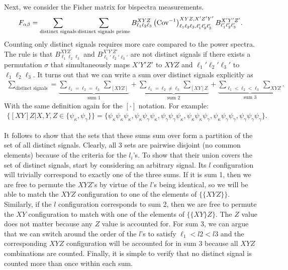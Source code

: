 \documentclass[11pt]{article} %
\DeclareRobustCommand{\Cov}{\ifmmode\text{Cov}\else d\fi}
\newcommand{\br}[1]{\ensuremath{\left( #1 \right)}}
\begin{document}
Next, we consider the Fisher matrix for bispectra measurements.
\begin{equation*}
    F_{\alpha\beta} = \sum_{\text{distinct signals}}\sum_{\text{distinct signals prime}} B^{XYZ}_{\ell_1\ell_2\ell_3}\br{\Cov^{-1}}^{XYZ,X'Z'Y'}_{\ell_1\ell_2\ell_3,\ell_1'\ell_2'\ell_3'}B^{X'Y'Z'}_{\ell_1'\ell_2'\ell_3'}.
\end{equation*} 
Counting only distinct signals requires more care compared to the power spectra. The rule is that $B^{XYZ}_{\ell_1\ell_2\ell_3}$ and $B^{X'Y'Z'}_{\ell_1'\ell_2'\ell_3'}$ are not distinct signals if there exists a permutation $\sigma$ that simultaneously maps $X'Y'Z'$ to $XYZ$ and $\ell_1'\ell_2'\ell_3'$ to $\ell_1\ell_2\ell_3$. It turns out that we can write a sum over distinct signals explicitly as
\begin{gather*}
    \sum_{\text{distinct signals}} = \underbrace{\sum_{\ell_1=\ell_2=\ell_3}\sum_{[XYZ]}}_{\text{sum }1} + \underbrace{\sum_{\ell_1=\ell_2\neq \ell_3}\sum_{[XY]Z}}_{\text{sum }2} + \underbrace{\sum_{\ell_1<\ell_2<\ell_3}\sum_{XYZ}}_{\text{sum }3}.
\end{gather*}
With the same definition again for the $[\cdot]$ notation. For example:
\begin{gather*}
    \{[XY]Z|X,Y,Z\in\{\psi_\kappa, \psi_\gamma\}\} = \{\psi_\kappa\psi_\kappa\psi_\kappa, \psi_\kappa\psi_\gamma\psi_\kappa, \psi_\gamma\psi_\gamma\psi_\kappa,\psi_\kappa\psi_\kappa\psi_\gamma, \psi_\kappa\psi_\gamma\psi_\gamma, \psi_\gamma\psi_\gamma\psi_\gamma\}.
\end{gather*}

It follows to show that the sets that these sums sum over form a partition of the set of all distinct signals. Clearly, all 3 sets are pairwise disjoint (no common elements) because of the criteria for the $l_i$'s. To show that their union covers the set of distinct signals, start by considering an arbitrary signal. Its $l$ configuration will trivially correspond to exactly one of the three sums. If it is sum 1, then we are free to permute the $XYZ$'s by virtue of the $l$'s being identical, so we will be able to match the $XYZ$ configuration to one of the elements of $\{\{XYZ\}\}$. Similarly, if the $l$ configuration corresponds to sum 2, then we are free to permute the $XY$ configuration to match with one of the elements of $\{\{XY\}Z\}$. The $Z$ value does not matter because any $Z$ value is accounted for. For sum 3, we can argue that we can switch around the order of the $l$'s to satisfy $\ell_1 < l2 < l3$ and the corresponding $XYZ$ configuration will be accounted for in sum 3 because all $XYZ$ combinations are counted. Finally, it is simple to verify that no distinct signal is counted more than once within each sum.
\end{document}
